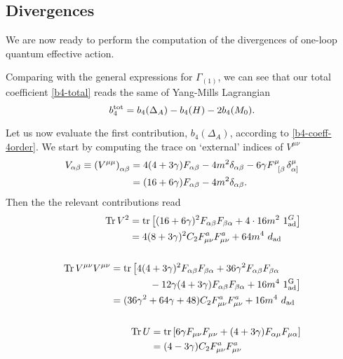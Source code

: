 \subsection{Divergences}


We are now ready to perform the computation of the divergences of one-loop quantum effective action.

Comparing with the general expressions for $\Gamma_{(1)}$, we can see that our total coefficient \eqref{b4-total} reads the same of Yang-Mills Lagrangian
\begin{equation}\label{b4-tot-hdym}
b_4^{ \text{tot} }
	=
b_4(\Delta_A)
- b_4(H)
- 2 b_4(M_0).
\end{equation}

Let us now evaluate the first contribution, $b_4(\Delta_A)$, according to \eqref{b4-coeff-4order}.
 We start by computing the trace on `external' indices of \( V^{\mu \nu} \)
\begin{equation}
\begin{split}
V_{\alpha \beta} \equiv \left( V^{\mu\mu} \right)_{\alpha \beta } 
	& =
		4 (4 + 3 \gamma) F_{ \alpha \beta} 
		- 4  m^2 \delta_{\alpha \beta} 
		- 6 \gamma F\indices{^{\mu}_{[ \beta } } \delta^{\mu }_{{ \alpha] } }\\*
	& = 
		(16 + 6 \gamma) F_{ \alpha \beta} 
		- 4  m^2 \delta_{\alpha \beta} .
\end{split}
\end{equation}
Then the the relevant contributions read
\begin{align}
\begin{split}
\Tr V^2 
	& 	= \tr
			\left[ 
				(16+6\gamma)^2 F_{ \alpha \beta } F_{ \beta \alpha }
				+ 4 \cdot 16 m^2 \ 1_{\text{ad}}^G
			\right] \\
	&	= 4(8 + 3 \gamma)^2 C_2 F^a_{\mu\nu}F^a_{\mu\nu} +  64 m^4 \ d_\ad 
\end{split}
	\\ \nonumber \\
\begin{split}
\Tr V^{\mu \nu} V^{\mu \nu}		
	&	= \tr 
			\big[ 
				4 (4+3\gamma)^2 F_{ \alpha \beta } F_{ \beta \alpha }
				+ 36 \gamma^2 F_{\alpha \beta  } F_{ \beta  \alpha}
			\\
			& \qquad\qquad
				- 12\gamma (4 + 3 \gamma ) F_{\alpha \beta} F_{\beta \alpha}
				+ 16 m^4 \  1_{\text{ad}}^{\GroupName{G}} 
			\big]\\
	&	= (36 \gamma^2 + 64 \gamma + 48)C_2 F^a_{\mu\nu}F^a_{\mu\nu}  +  16 m^4 \ d_{\ad}
\end{split}
	\\ \nonumber \\
\begin{split}
\Tr U	
	&	= \tr
			\left[
				6 \gamma F_{ \mu \nu } F_{ \mu \nu }
				+ (4 + 3 \gamma ) F_{\alpha \mu} F_{ \mu \alpha}
			\right] \\
	& = ( 4 - 3 \gamma)C_2 F^a_{\mu\nu}F^a_{\mu\nu}  
\end{split}
\end{align}
